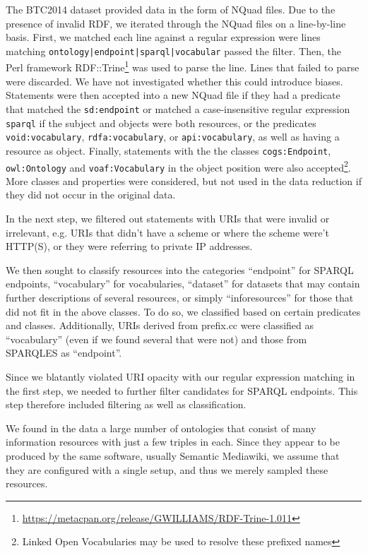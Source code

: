 \documentclass[a4paper,english]{article}
\newcommand{\rdfterm}[1]{\texttt{#1}}
\begin{document}
The BTC2014 dataset provided data in the form of NQuad files. Due to
the presence of invalid RDF, we iterated through the NQuad files on a
line-by-line basis. First, we matched each line against a regular
expression were lines matching
\texttt{ontology|endpoint|sparql|vocabular} passed the filter. Then,
the Perl framework
RDF::Trine\footnote{\url{https://metacpan.org/release/GWILLIAMS/RDF-Trine-1.011}}
was used to parse the line. Lines that failed to parse were
discarded. We have not investigated whether this could introduce
biases. Statements were then accepted into a new NQuad file if they
had a predicate that matched the \rdfterm{sd:endpoint} or matched a
case-insensitive regular expression \texttt{sparql} if the subject and
objects were both resources, or the predicates
\rdfterm{void:vocabulary}, \rdfterm{rdfa:vocabulary}, or
\rdfterm{api:vocabulary}, as well as having a resource as
object. Finally, statements with the the classes
\rdfterm{cogs:Endpoint}, \rdfterm{owl:Ontology} and
\rdfterm{voaf:Vocabulary} in the object position were also
accepted\footnote{Linked Open Vocabularies \cite{lov2} may be used to
  resolve these prefixed names}. More classes and properties were
considered, but not used in the data reduction if they did not occur
in the original data.

In the next step, we filtered out statements with URIs that were
invalid or irrelevant, e.g. URIs that didn't have a scheme or where
the scheme were't HTTP(S), or they were referring to private IP addresses.

We then sought to classify resources into the categories ``endpoint''
for SPARQL endpoints, ``vocabulary'' for vocabularies, ``dataset'' for
datasets that may contain further descriptions of several resources,
or simply ``inforesources'' for those that did not fit in the above
classes. To do so, we classified based on certain predicates and
classes. Additionally, URIs derived from prefix.cc were classified as
``vocabulary'' (even if we found several that were not) and those from
SPARQLES as ``endpoint''.

Since we blatantly violated URI opacity with our regular expression
matching in the first step, we needed to further filter candidates for
SPARQL endpoints. This step therefore included filtering as well as
classification.

We found in the data a large number of ontologies that consist of many
information resources with just a few triples in each. Since they
appear to be produced by the same software, usually Semantic
Mediawiki, we assume that they are configured with a single setup, and
thus we merely sampled these resources.
\end{document}
